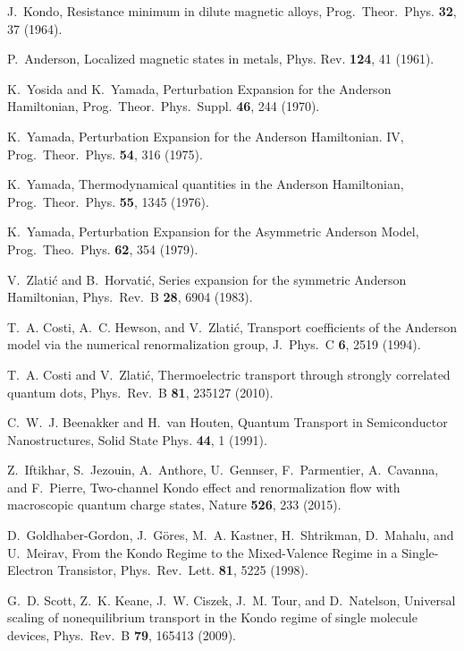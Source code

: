 \documentclass[aps,twocolumn,showpacs,floatfix,prl]{revtex4}
\begin{document}
\begin{thebibliography}{10}

J.~Kondo, Resistance minimum in dilute magnetic alloys, Prog.~Theor.~Phys. {\bf
  32}, 37 (1964).

P.~Anderson, Localized magnetic states in metals, Phys. Rev. {\bf 124}, 41 (1961).

K.~Yosida and K.~Yamada, Perturbation Expansion for the Anderson Hamiltonian,
  Prog.~Theor.~Phys.~Suppl. {\bf 46}, 244 (1970).

K.~Yamada, Perturbation Expansion for the {A}nderson Hamiltonian. IV,
  Prog.~Theor.~Phys. {\bf 54}, 316 (1975).

K.~Yamada, Thermodynamical quantities in the {A}nderson Hamiltonian,
  Prog.~Theor.~Phys. {\bf 55}, 1345 (1976).

K.~Yamada, Perturbation Expansion for the Asymmetric Anderson Model,
  Prog.~Theo.~Phys. {\bf 62}, 354 (1979).

V.~Zlati\'{c} and B.~Horvati\'{c}, Series expansion for the symmetric Anderson
  Hamiltonian, Phys.~Rev.~B {\bf 28}, 6904 (1983).

T.~A. Costi, A.~C. Hewson, and V.~Zlati\'{c}, Transport coefficients of the
  {A}nderson model via the numerical renormalization group, J.~Phys.~C {\bf 6},
  2519 (1994).

T.~A. Costi and V.~Zlati\'{c}, Thermoelectric transport through strongly
  correlated quantum dots, Phys.~Rev.~B {\bf 81}, 235127 (2010).

C.~W.~J. Beenakker and H.~van Houten, Quantum Transport in Semiconductor
  Nanostructures, Solid State Phys. {\bf 44}, 1 (1991).

Z.~Iftikhar, S.~Jezouin, A.~Anthore, U.~Gennser, F.~Parmentier, A.~Cavanna, and
  F.~Pierre, Two-channel Kondo effect and renormalization flow with macroscopic
  quantum charge states, Nature {\bf 526}, 233 (2015).

D.~Goldhaber-Gordon, J.~G\"{o}res, M.~A. Kastner, H.~Shtrikman, D.~Mahalu, and
  U.~Meirav, From the Kondo Regime to the Mixed-Valence Regime in a
  Single-Electron Transistor, Phys.~Rev.~Lett. {\bf 81}, 5225 (1998).

G.~D. Scott, Z.~K. Keane, J.~W. Ciszek, J.~M. Tour, and D.~Natelson, Universal
  scaling of nonequilibrium transport in the Kondo regime of single molecule
  devices, Phys.~Rev.~B {\bf 79}, 165413 (2009).


\end{thebibliography}
\end{document}
